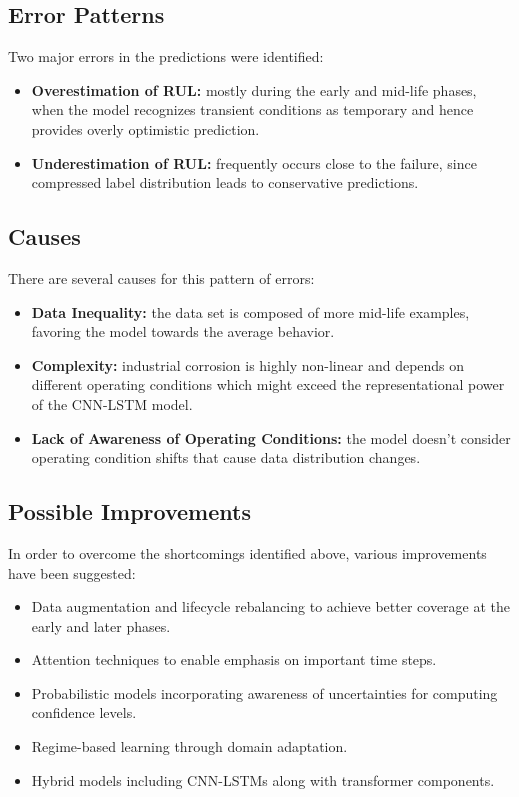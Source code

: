 \documentclass[conference]{IEEEtran}
\begin{document}
\subsection{Error Patterns}
Two major errors in the predictions were identified:
\begin{itemize}
  \item \textbf{Overestimation of RUL:} mostly during the early and mid-life phases, when the model recognizes transient conditions as temporary and hence provides overly optimistic prediction.
  \item \textbf{Underestimation of RUL:} frequently occurs close to the failure, since compressed label distribution leads to conservative predictions.
\end{itemize}

\subsection{Causes}
There are several causes for this pattern of errors:
\begin{itemize}
  \item \textbf{Data Inequality:} the data set is composed of more mid-life examples, favoring the model towards the average behavior.
  \item \textbf{Complexity:} industrial corrosion is highly non-linear and depends on different operating conditions which might exceed the representational power of the CNN-LSTM model.
  \item \textbf{Lack of Awareness of Operating Conditions:} the model doesn’t consider operating condition shifts that cause data distribution changes.
\end{itemize}

\subsection{Possible Improvements}
In order to overcome the shortcomings identified above, various improvements have been suggested:
\begin{itemize}
  \item Data augmentation and lifecycle rebalancing to achieve better coverage at the early and later phases.
  \item Attention techniques to enable emphasis on important time steps.
  \item Probabilistic models incorporating awareness of uncertainties for computing confidence levels.
  \item Regime-based learning through domain adaptation.
  \item Hybrid models including CNN-LSTMs along with transformer components.
\end{itemize}
\end{document}
